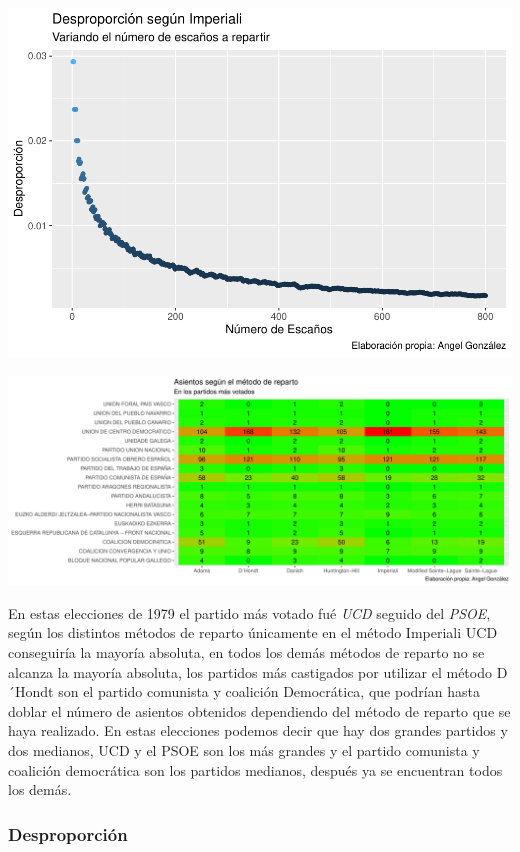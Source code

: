 \documentclass[12pt,a4paper,]{book}
\numberwithin{dummy}{section}
\theoremstyle{ocrenumbox}
\theoremstyle{blacknumex}
\theoremstyle{blacknumbox}
\theoremstyle{ocrenum}
\theoremstyle{ocrenum}
\begin{document}
\begin{center}\includegraphics[width=0.95\linewidth]{figurasR/unnamed-chunk-20-1} \end{center}

\begin{center}\includegraphics[width=0.95\linewidth]{figurasR/unnamed-chunk-20-2} \end{center}

En estas elecciones de 1979 el partido más votado fué \emph{UCD} seguido
del \emph{PSOE}, según los distintos métodos de reparto únicamente en el
método Imperiali UCD conseguiría la mayoría absoluta, en todos los demás
métodos de reparto no se alcanza la mayoría absoluta, los partidos más
castigados por utilizar el método D´Hondt son el partido comunista y
coalición Democrática, que podrían hasta doblar el número de asientos
obtenidos dependiendo del método de reparto que se haya realizado. En
estas elecciones podemos decir que hay dos grandes partidos y dos
medianos, UCD y el PSOE son los más grandes y el partido comunista y
coalición democrática son los partidos medianos, después ya se
encuentran todos los demás.

\hypertarget{desproporciuxf3n-1}{%
\subsubsection{Desproporción}\label{desproporciuxf3n-1}}
\end{document}
